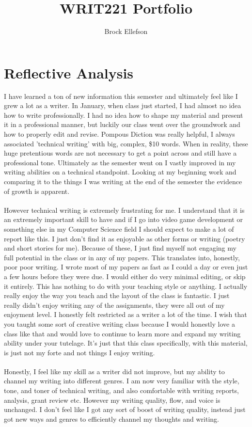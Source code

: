 \documentclass[12pt,letterpaper]{article}
\author{Brock Ellefson}
\title{WRIT221 Portfolio}
\begin{document}
\maketitle
\newpage
\doublespacing
\newpage
\tableofcontents
\newpage
\section{Reflective Analysis}
I have learned a ton of new information this semester and ultimately feel like I grew a lot as a writer. In January, when class just started, I had almost no idea how to write professionally. I had no idea how to shape my material and present it in a professional manner, but luckily our class went over the groundwork and how to properly edit and revise. Pompous Diction was really helpful, I always associated 'technical writing' with big, complex, \$10 words. When in reality, these huge pretentious words are not necessary to get a point across and still have a professional tone. Ultimately as the semester went on I vastly improved in my writing abilities on a technical standpoint. Looking at my beginning work and comparing it to the things I was writing at the end of the semester the evidence of growth is apparent.\\
\\
However technical writing is extremely frustrating for me. I understand that it is an extremely important skill to have and if I go into video game development or something else in my Computer Science field I should expect to make a lot of report like this. I just don't find it as enjoyable as other forms or writing (poetry and short stories for me). Because of these, I just find myself not engaging my full potential in the class or in any of my papers. This translates into, honestly, poor poor writing. I wrote most of my papers as fast as I could a day or even just a few hours before they were due. I would either do very minimal editing, or skip it entirely. This has nothing to do with your teaching style or anything. I actually really enjoy the way you teach and the layout of the class is fantastic. I just really didn't enjoy writing any of the assignments, they were all out of my enjoyment level. I honestly felt restricted as a writer a lot of the time. I wish that you taught some sort of creative writing class because I would honestly love a class like that and would love to continue to learn more and expand my writing ability under your tutelage. It's just that this class specifically, with this material, is just not my forte and not things I enjoy writing.  \\
\\
Honestly, I feel like my skill as a writer did not improve, but my ability to channel my writing into different genres. I am now very familiar with the style, tone, and toner of technical writing, and also comfortable with writing reports, analysis, grant review etc. However my writing quality, flow, and voice is unchanged. I don't feel like I got any sort of boost of writing quality, instead just got new ways and genres to efficiently channel my thoughts and writing. 
\end{document}
